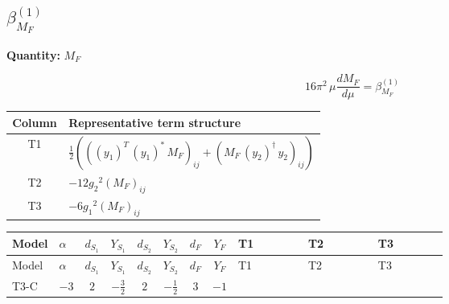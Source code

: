 \documentclass[8pt]{article}
\begin{document}
\begin{landscape}
\section*{$\beta_{M_F}^{(1)}$}
\noindent\textbf{Quantity: }$M_F$\par\smallskip
\[16\pi^2\,\mu\frac{d M_F}{d\mu}=\beta_{M_F}^{(1)}\]
\begin{center}
\begin{tabular}{@{}c >{\raggedright\arraybackslash}p{0.82\linewidth}@{}}
\toprule
Column & Representative term structure \\
\midrule
T1 & \(\displaystyle \frac{1}{2} (\left(\left({y_1}\right)^{T}\,\left({y_1}\right)^{*}\,{M_F}\right)_{ij}+\left({M_F}\,\left({y_2}\right)^{\dagger}\,{y_2}\right)_{ij})\) \\
\midrule
T2 & \(\displaystyle -12 {g_2}^2 \left({M_F}\right)_{ij}\) \\
\midrule
T3 & \(\displaystyle -6 {g_1}^2 \left({M_F}\right)_{ij}\) \\
\midrule
\bottomrule
\end{tabular}
\end{center}
\smallskip
\tiny
\begin{longtable}{@{}llcccccc >{\raggedright\arraybackslash}p{0.21\linewidth} >{\raggedright\arraybackslash}p{0.21\linewidth} >{\raggedright\arraybackslash}p{0.21\linewidth}@{}}
\toprule
Model & $\alpha$ & $d_{S_1}$ & $Y_{S_1}$ & $d_{S_2}$ & $Y_{S_2}$ & $d_F$ & $Y_F$ & T1 & T2 & T3 \\
\midrule
\endfirsthead
\toprule
Model & $\alpha$ & $d_{S_1}$ & $Y_{S_1}$ & $d_{S_2}$ & $Y_{S_2}$ & $d_F$ & $Y_F$ & T1 & T2 & T3 \\
\midrule
\endhead
T3-C & $-3$ & $2$ & $-\frac{3}{2}$ & $2$ & $-\frac{1}{2}$ & $3$ & $-1$ & \scriptsize\adjustbox{max width=\linewidth}{$\begin{gathered} \frac{1}{2} (\left(\left({y_1}\right)^{T}\,\left({y_1}\right)^{*}\,{M_F}\right)_{ij}+\left({M_F}\,\left({y_2}\right)^{\dagger}\,{y_2}\right)_{ij})\end{gathered}$} & \scriptsize\adjustbox{max width=\linewidth}{$\begin{gathered} -12 {g_2}^2 \left({M_F}\right)_{ij}\end{gathered}$} & \scriptsize\adjustbox{max width=\linewidth}{$\begin{gathered} -6 {g_1}^2 \left({M_F}\right)_{ij}\end{gathered}$} \\
\midrule
\bottomrule
\end{longtable}
\clearpage

\end{landscape}
\end{document}
